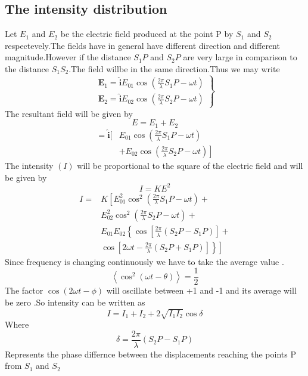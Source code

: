 \subsection{The intensity distribution}
Let $E_1$ and $E_2$ be the electric field produced at the point P by $S_1$ and $S_2$ respectevely.The fields have in general have different direction and different magnitude.However if the distance $S_1P$ and $S_2P$ are very large in comparison to the distance $S_1S_2$.The field willbe in the same direction.Thus we may write\\
$$\left.\begin{array}{l}
\mathbf{E}_{1}=\hat{\mathbf{i}} E_{01} \cos \left(\frac{2 \pi}{\lambda} S_{1} P-\omega t\right) \\
\mathbf{E}_{2}=\hat{\mathbf{i}} E_{02} \cos \left(\frac{2 \pi}{\lambda} S_{2} P-\omega t\right)
\end{array}\right\}$$
The resultant field will be given by \\
$$E=E_1+E_2$$
$$\begin{aligned}
=\hat{\mathbf{i}}[& E_{01} \cos \left(\frac{2 \pi}{\lambda} S_{1} P-\omega t\right) \\
&\left.+E_{02} \cos \left(\frac{2 \pi}{\lambda} S_{2} P-\omega t\right)\right]
\end{aligned}$$
The intensity $(I)$ will be proportional to the square of the electric field and will be given by
$$
I=K E^{2}
$$
$$\begin{aligned}
I=& K\left[E_{01}^{2} \cos ^{2}\left(\frac{2 \pi}{\lambda} S_{1} P-\omega t\right)+\right.\\
& E_{02}^{2} \cos ^{2}\left(\frac{2 \pi}{\lambda} S_{2} P-\omega t\right)+\\
& E_{01} E_{02}\left\{\cos \left[\frac{2 \pi}{\lambda}\left(S_{2} P-S_{1} P\right)\right]+\right.\\
&\left.\left.\cos \left[2 \omega t-\frac{2 \pi}{\lambda}\left(S_{2} P+S_{1} P\right)\right]\right\}\right]
\end{aligned}$$
Since frequency is changing continuously we have to take the average value .\\
$$\left\langle\cos ^{2}(\omega t-\theta)\right\rangle=\frac{1}{2}$$
The factor $\cos(2\omega t-\phi)$ will oscillate between +1 and -1 and its average will be zero .So intensity can be written as\\
$$I=I_1+I_2+2\sqrt{I_1I_2}\cos \delta$$
Where $$\delta=\frac{2\pi}{\lambda}(S_2P-S_1P)$$
Represents the phase differnce between the displacements reaching the points P from $S_1$ and $S_2$
